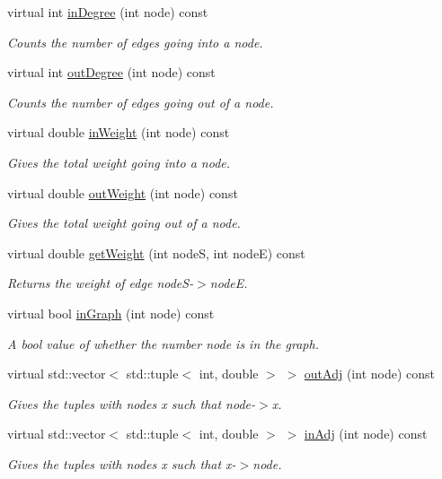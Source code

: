 \begin{DoxyCompactItemize}
virtual int \hyperlink{class_alg_lib_1_1_graph_af0d0a75b2003e433cc1f78cc2d528de6}{in\+Degree} (int node) const 
\begin{DoxyCompactList}\small\item\em Counts the number of edges going into a node. \end{DoxyCompactList}\item 
virtual int \hyperlink{class_alg_lib_1_1_graph_afd5a7862e0d564d4eb35bccae5b13d75}{out\+Degree} (int node) const 
\begin{DoxyCompactList}\small\item\em Counts the number of edges going out of a node. \end{DoxyCompactList}\item 
virtual double \hyperlink{class_alg_lib_1_1_graph_a320cb53252cef3ea2f1995dde174c727}{in\+Weight} (int node) const 
\begin{DoxyCompactList}\small\item\em Gives the total weight going into a node. \end{DoxyCompactList}\item 
virtual double \hyperlink{class_alg_lib_1_1_graph_ad0d722ed1e8530d3b6cdfa2224facb84}{out\+Weight} (int node) const 
\begin{DoxyCompactList}\small\item\em Gives the total weight going out of a node. \end{DoxyCompactList}\item 
virtual double \hyperlink{class_alg_lib_1_1_graph_acecdf6452fd10b763e8e9af300126771}{get\+Weight} (int nodeS, int nodeE) const 
\begin{DoxyCompactList}\small\item\em Returns the weight of edge node\+S-\/$>$nodeE. \end{DoxyCompactList}\item 
virtual bool \hyperlink{class_alg_lib_1_1_graph_a9b503efefa9c45a6acc9933a3502283c}{in\+Graph} (int node) const 
\begin{DoxyCompactList}\small\item\em A bool value of whether the number node is in the graph. \end{DoxyCompactList}\item 
virtual std\+::vector$<$ std\+::tuple$<$ int, double $>$ $>$ \hyperlink{class_alg_lib_1_1_graph_ab7c03a0caa842c589334c3a4aaaf4746}{out\+Adj} (int node) const 
\begin{DoxyCompactList}\small\item\em Gives the tuples with nodes x such that node-\/$>$x. \end{DoxyCompactList}\item 
virtual std\+::vector$<$ std\+::tuple$<$ int, double $>$ $>$ \hyperlink{class_alg_lib_1_1_graph_a59f621c5416a42b2b040b7bdd2d6b453}{in\+Adj} (int node) const 
\begin{DoxyCompactList}\small\item\em Gives the tuples with nodes x such that x-\/$>$node. \end{DoxyCompactList}\end{DoxyCompactItemize}


